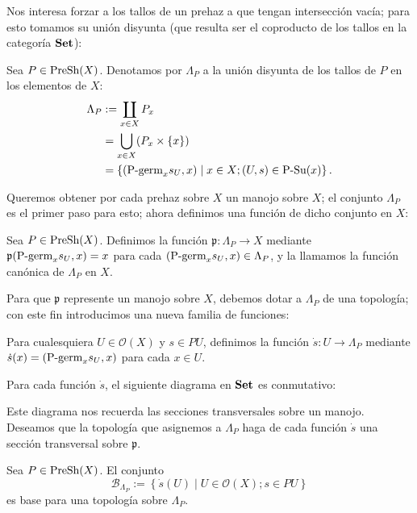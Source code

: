 Nos interesa forzar a los tallos de un prehaz a que tengan intersección vacía; para esto tomamos su unión disyunta (que resulta ser el coproducto de los tallos en la categoría $\normalfont{\textbf{Set}}$):
\begin{Def}
   Sea $P\in\normalfont{\text{PreSh}}(X)$. Denotamos por $\Lambda_P$ a la unión disyunta de los tallos de $P$ en los elementos de $X$:
   $$
   \begin{aligned}
      \Lambda_P&:=\coprod_{x\in X}P_{x}\\
               &=\bigcup_{x\in X}(P_{x}\times\left\lbrace x\right\rbrace)\\
               &=\left\lbrace (\normalfont{\text{P-germ}}_{x}s_{U},x)\mid x\in X;(U,s)\in\normalfont{\text{P-Su}}(x)\right\rbrace.
   \end{aligned}
   $$
\end{Def}
Queremos obtener por cada prehaz sobre $X$ un manojo sobre $X$; el conjunto $\Lambda_P$ es el primer paso para esto; ahora definimos una función de dicho conjunto en $X$:
\begin{Def}
   Sea $P\in\normalfont{\text{PreSh}}(X)$. Definimos la función $\mathfrak{p}:\Lambda_P\to X$ mediante $\mathfrak{p}(\normalfont{\text{P-germ}}_{x}s_{U},x)=x$ para cada $(\normalfont{\text{P-germ}}_{x}s_{U},x)\in\Lambda_P$, y la llamamos la función canónica de $\Lambda_P$ en $X$. 
\end{Def}
Para que $\mathfrak{p}$ represente un manojo sobre $X$, debemos dotar a $\Lambda_P$ de una topología; con este fin introducimos una nueva familia de funciones:
\begin{Def}
   Para cualesquiera $U\in\mathcal{O}(X)$ y $s\in PU$, definimos la función $\dot{s}:U\to\Lambda_P$ mediante $\dot{s}(x)=(\normalfont{\text{P-germ}}_{x}s_{U},x)$ para cada $x\in U$.
\end{Def}
Para cada función $\dot{s}$, el siguiente diagrama en $\normalfont{\textbf{Set}}$ es conmutativo:
   
Este diagrama nos recuerda las secciones transversales sobre un manojo. Deseamos que la topología que asignemos a $\Lambda_P$ haga de cada función $\dot{s}$ una sección transversal sobre $\mathfrak{p}$.
\begin{Prop}
   Sea $P\in\normalfont{\text{PreSh}}(X)$. El conjunto
   $$
      \mathcal{B}_{\Lambda_P}:=\left\lbrace \dot{s}(U)\mid U\in\mathcal{O}(X);s\in PU\right\rbrace
   $$
   es base para una topología sobre $\Lambda_P$.
\end{Prop}
